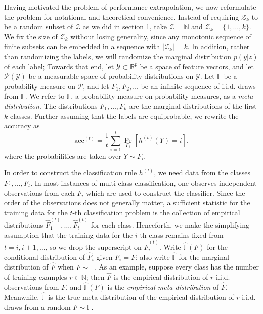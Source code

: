\documentclass{article}
\begin{document}
Having motivated the problem of performance extrapolation,
we now reformulate the problem for notational and theoretical convenience.
Instead of requiring $\mathcal{Z}_k$ to be a random subset of $\mathcal{Z}$ as we did in section 1, take
$\mathcal{Z}=\mathbb{N}$ and $\mathcal{Z}_k = \{1,\hdots, k\}$.
We fix the size of $\mathcal{Z}_k$ without losing generality, since any monotonic sequence of 
finite subsets can be embedded in a sequence with $|\mathcal{Z}_k| = k$.
In addition, rather than randomizing the labels, we will randomize the marginal distribution $p(y|z)$ of each label;
Towards that end, let $\mathcal{Y} \subset \mathbb{R}^p$ be a space of feature vectors, and
let $\mathcal{P}(\mathcal{Y})$ be a measurable space of probability distributions on $\mathcal{Y}$.
Let $\mathbb{F}$ be a probability measure on $\mathcal{P}$,
and let $F_1, F_2,\hdots$ be an infinite sequence of i.i.d. draws from $\mathbb{F}$.
We refer to $\mathbb{F}$, a probability measure on probability measures, as a \emph{meta-distribution}.
The distributions $F_1,\hdots, F_k$ are the marginal distributions of the first $k$ classes.
Further assuming that the labels are equiprobable, we rewrite the accuracy as
\[
\text{acc}^{(t)} = \frac{1}{t}\sum_{i=1}^t \Pr_{F_i}[h^{(t)}(Y) = i].
\]
where the probabilities are taken over $Y \sim F_i$.

In order to construct the classification rule $h^{(t)}$, we need data from the classes $F_1,\hdots, F_t$.
In most instances of multi-class classification, one observes independent observations from each $F_i$
which are used to construct the classifier.  Since the order of the observations
does not generally matter, a sufficient statistic for the training data for the $t$-th classification problem
is the collection of empirical distributions
$\hat{F}_1^{(t)},\hdots,\hat{F}_t^{(t)}$ for each class.
Henceforth, we make the simplifying assumption that the training data for the $i$-th class remains fixed
from $t =i, i+1,\hdots$, so we drop the superscript on $\hat{F}_i^{(t)}$.
Write $\hat{\mathbb{F}}(F)$ for the conditional distribution of $\hat{F}_i$ given  $F_i = F$;
also write $\hat{\mathbb{F}}$ for the marginal distribution of $\hat{F}$ when $F \sim \mathbb{F}.$
As an example, suppose every class has the number of training examples $r \in \mathbb{N}$; then $\hat{F}$
is the empirical distribution of $r$ i.i.d. observations from $F$, and $\hat{\mathbb{F}}(F)$ is the \emph{empirical meta-distribution} of $\hat{F}$.
Meanwhile, $\hat{\mathbb{F}}$ is the true meta-distribution of the empirical distribution of $r$ i.i.d. draws from a random $F \sim \mathbb{F}$.
\end{document}
